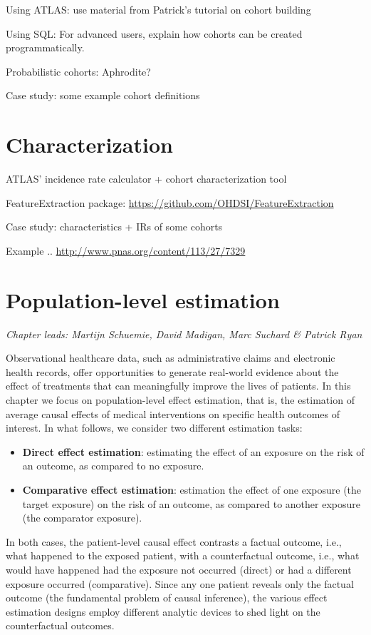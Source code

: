 \documentclass[11pt]{book}
\providecommand{\tightlist}{%
  \setlength{\itemsep}{0pt}\setlength{\parskip}{0pt}}
\begin{document}
Using ATLAS: use material from Patrick's tutorial on cohort building

Using SQL: For advanced users, explain how cohorts can be created
programmatically.

Probabilistic cohorts: Aphrodite?

Case study: some example cohort definitions

\chapter{Characterization}\label{Characterization}

ATLAS' incidence rate calculator + cohort characterization tool

FeatureExtraction package:
\url{https://github.com/OHDSI/FeatureExtraction}

Case study: characteristics + IRs of some cohorts

Example .. \url{http://www.pnas.org/content/113/27/7329}

\chapter{Population-level estimation}\label{PopulationLevelEstimation}

\emph{Chapter leads: Martijn Schuemie, David Madigan, Marc Suchard \&
Patrick Ryan}

Observational healthcare data, such as administrative claims and
electronic health records, offer opportunities to generate real-world
evidence about the effect of treatments that can meaningfully improve
the lives of patients. In this chapter we focus on population-level
effect estimation, that is, the estimation of average causal effects of
medical interventions on specific health outcomes of interest. In what
follows, we consider two different estimation tasks:

\begin{itemize}
\tightlist
\item
  \textbf{Direct effect estimation}: estimating the effect of an
  exposure on the risk of an outcome, as compared to no exposure.
\item
  \textbf{Comparative effect estimation}: estimation the effect of one
  exposure (the target exposure) on the risk of an outcome, as compared
  to another exposure (the comparator exposure).
\end{itemize}

In both cases, the patient-level causal effect contrasts a factual
outcome, i.e., what happened to the exposed patient, with a
counterfactual outcome, i.e., what would have happened had the exposure
not occurred (direct) or had a different exposure occurred
(comparative). Since any one patient reveals only the factual outcome
(the fundamental problem of causal inference), the various effect
estimation designs employ different analytic devices to shed light on
the counterfactual outcomes.
\end{document}
